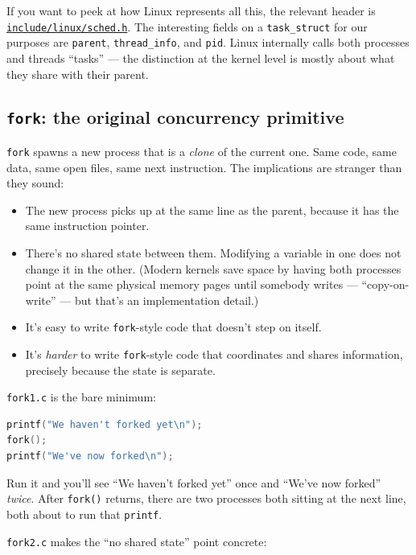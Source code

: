 \documentclass[11pt]{article}
\begin{document}
If you want to peek at how Linux represents all this, the relevant
header is
\href{https://github.com/torvalds/linux/blob/master/include/linux/sched.h}{\texttt{include/linux/sched.h}}.
The interesting fields on a \texttt{task\_struct} for our purposes are
\texttt{parent}, \texttt{thread\_info}, and \texttt{pid}. Linux
internally calls both processes and threads ``tasks'' --- the
distinction at the kernel level is mostly about what they share with
their parent.

\subsection*{\texttt{fork}: the original concurrency primitive}

\texttt{fork} spawns a new process that is a \emph{clone} of the
current one. Same code, same data, same open files, same next
instruction. The implications are stranger than they sound:

\begin{itemize}
  \item The new process picks up at the same line as the parent,
    because it has the same instruction pointer.
  \item There's no shared state between them. Modifying a variable in
    one does not change it in the other. (Modern kernels save space by
    having both processes point at the same physical memory pages
    until somebody writes --- ``copy-on-write'' --- but that's an
    implementation detail.)
  \item It's easy to write \texttt{fork}-style code that doesn't step
    on itself.
  \item It's \emph{harder} to write \texttt{fork}-style code that
    coordinates and shares information, precisely because the state is
    separate.
\end{itemize}

\texttt{fork1.c} is the bare minimum:

\begin{lstlisting}[language=C]
printf("We haven't forked yet\n");
fork();
printf("We've now forked\n");
\end{lstlisting}

Run it and you'll see ``We haven't forked yet'' once and ``We've now
forked'' \emph{twice}. After \texttt{fork()} returns, there are two
processes both sitting at the next line, both about to run that
\texttt{printf}.

\texttt{fork2.c} makes the ``no shared state'' point concrete:
\end{document}
